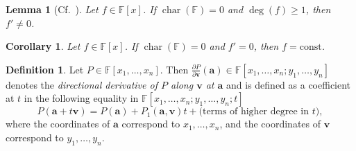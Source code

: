 \documentclass{elsarticle}
\DeclareMathOperator{\Char}{char}
\def\F{{\mathbb F}}
\newtheorem{lemma}[theorem]{Lemma}
\newtheorem{corollary}[theorem]{Corollary}
\theoremstyle{definition}
\newtheorem{definition}[theorem]{Definition}
\numberwithin{equation}{section}
\begin{document}
\begin{lemma}[{Cf.~\cite[IV, \S 1, Proposition 1.12]{Lang2002}}]\label{lem:DegGE1DerNonZero}Let $f \in \F[x]$. If $\Char(\F) = 0$ and $\deg(f) \ge 1$, then $f' \neq 0$.
\end{lemma}

\begin{corollary}\label{cor:DerZeroPolConst}Let $f \in \F[x]$. If $\Char(\F) = 0$ and $f' = 0$, then $f = \mathrm{const}$.
\end{corollary}
%
%

\begin{definition}%
Let $P \in \F[x_1,\ldots, x_n]$. Then $\frac{\partial P}{\partial \mathbf v}(\mathbf a) \in \F[x_1,\ldots, x_n; y_1, \ldots, y_n]$ denotes the \emph{directional derivative of $P$ along $\mathbf v$ at $\mathbf a$} and is defined as a coefficient at $t$ in the following equality in $\F[x_1,\ldots, x_n; y_1, \ldots, y_n; t]$%
\[
P(\mathbf a + t \mathbf v) = P(\mathbf a)  + P_1(\mathbf a, \mathbf v)t + \mbox{(terms of higher degree in $t$)},
\]
where the coordinates of $\mathbf a$ correspond to $x_1,\ldots, x_n$, and  the coordinates of $\mathbf v$ correspond to $y_1,\ldots, y_n$. 
\end{definition}
\end{document}
